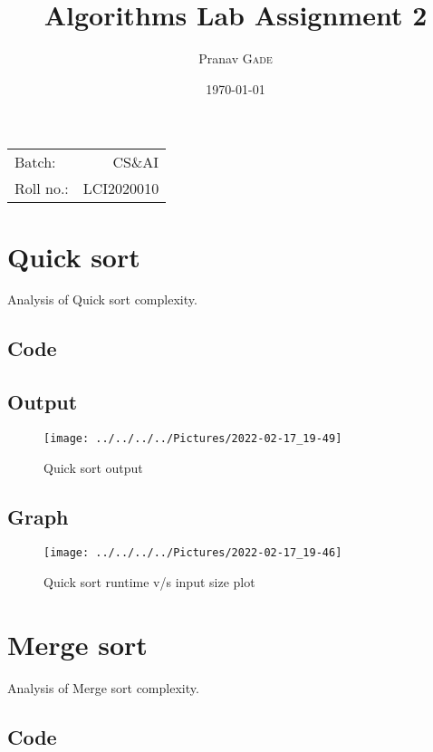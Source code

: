 \documentclass{article}
\title{Algorithms Lab Assignment 2} %
\author{Pranav \textsc{Gade}} %
\date{\today} %
\begin{document}
    \maketitle %

    \begin{center}
        \begin{tabular}{l r}
            Batch:    & CS\&AI     \\
            Roll no.: & LCI2020010
        \end{tabular}
    \end{center}


    \section{Quick sort}
    Analysis of Quick sort complexity.
    \subsection{Code}
    

    \subsection{Output}
    \begin{figure}[H]
        \centering
        \texttt{[image: ../../../../Pictures/2022-02-17\_19-49]}
        \caption{Quick sort output}
    \end{figure}

    \subsection{Graph}
    \begin{figure}[H]
        \centering
        \texttt{[image: ../../../../Pictures/2022-02-17\_19-46]}
        \caption{Quick sort runtime v/s input size plot}
    \end{figure}

    \section{Merge sort}
    Analysis of Merge sort complexity.
    \subsection{Code}
    
\end{document}
